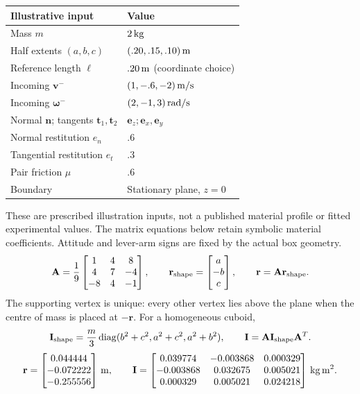 \begin{center}\small
\begin{tabular}{ll}
\hline
Illustrative input & Value\\
\hline
Mass $m$ & $2\,{\rm kg}$\\
Half extents $(a,b,c)$ & $(.20,.15,.10)\,{\rm m}$\\
Reference length $\ell$ & $.20\,{\rm m}$ (coordinate choice)\\
Incoming $\mathbf v^-$ & $(1,-.6,-2)\,{\rm m/s}$\\
Incoming $\boldsymbol\omega^-$ & $(2,-1,3)\,{\rm rad/s}$\\
Normal $\mathbf n$; tangents $\mathbf t_1,\mathbf t_2$ & $\mathbf e_z;\mathbf e_x,\mathbf e_y$\\
Normal restitution $e_n$ & $.6$\\
Tangential restitution $e_t$ & $.3$\\
Pair friction $\mu$ & $.6$\\
Boundary & Stationary plane, $z=0$\\
\hline
\end{tabular}\end{center}
These are prescribed illustration inputs, not a published material profile or fitted experimental values. The matrix equations below retain symbolic material coefficients. Attitude and lever-arm signs are fixed by the actual box geometry.
\begin{equation}
\mathbf A=\frac19\begin{bmatrix}1&4&8\\4&7&-4\\-8&4&-1\end{bmatrix},\qquad
\mathbf r_{\rm shape}=\begin{bmatrix}a\\-b\\c\end{bmatrix},\qquad
\mathbf r=\mathbf A\mathbf r_{\rm shape}.
\end{equation}
The supporting vertex is unique: every other vertex lies above the plane when the centre of mass is placed at $-\mathbf r$. For a homogeneous cuboid,
\begin{equation}
\mathbf I_{\rm shape}=\frac m3\operatorname{diag}(b^2+c^2,a^2+c^2,a^2+b^2),\qquad
\mathbf I=\mathbf A\mathbf I_{\rm shape}\mathbf A^T.
\end{equation}
\begin{equation}
\mathbf r=\begin{bmatrix}0.044444\\-0.072222\\-0.255556\end{bmatrix}\,{\rm m},\qquad
\mathbf I=\begin{bmatrix}0.039774 & -0.003868 & 0.000329\\-0.003868 & 0.032675 & 0.005021\\0.000329 & 0.005021 & 0.024218\end{bmatrix}\,{\rm kg\,m^2}.
\end{equation}
